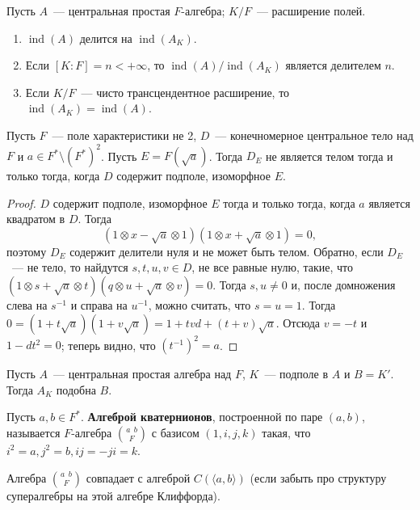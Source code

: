 \documentclass[a4paper,oneside,12pt]{article}
\theoremstyle{plain} { \swapnumbers
\newtheorem{theorem}{Теорема}[subsection]
\newtheorem{corollary}[theorem]{Следствие}
\newtheorem{lemma}[theorem]{Лемма}
\newtheorem{proposition}[theorem]{Утверждение}
\newtheorem{claim}[theorem]{Факт}
}
\theoremstyle{definition} { \swapnumbers
\newtheorem{definition}[theorem]{Определение}
\newtheorem{notation}[theorem]{Обозначение}
\newtheorem{remark}[theorem]{Замечание}
\newtheorem{remarks}[theorem]{Замечания}
\newtheorem{example}[theorem]{Пример}
\newtheorem{examples}[theorem]{Примеры}
\newtheorem{sssection}[theorem]{}
}
\def\la{\langle}
\def\ra{\rangle}
\def\ind{\operatorname{ind}}
\def\quaternion#1#2#3{\binom{{#1}\:\:{#2}}{#3}}
\begin{document}
\begin{proposition}
Пусть $A$~--- центральная простая $F$-алгебра; $K/F$~--- расширение полей.
\begin{enumerate}
\item $\ind(A)$ делится на $\ind(A_K)$.
\item Если $[K:F]=n<+\infty$, то $\ind(A)/\ind(A_K)$ является делителем $n$.
\item Если $K/F$~--- чисто трансцендентное расширение, то $\ind(A_K)=\ind(A)$.
\end{enumerate}
\end{proposition}

\begin{lemma}[Альберт]
Пусть $F$~--- поле характеристики не 2, $D$~--- конечномерное центральное тело над $F$ и $a\in F^*\setminus (F^*)^2$.
Пусть $E=F(\sqrt{a})$. Тогда $D_E$ не является телом тогда и только тогда, когда $D$ содержит подполе, изоморфное $E$.
\end{lemma}
\begin{proof}
$D$ содержит подполе, изоморфное $E$ тогда и только тогда, когда $a$ является квадратом в $D$. Тогда
$$
(1\otimes x-\sqrt{a}\otimes 1)(1\otimes x+\sqrt{a}\otimes 1)=0,
$$
поэтому $D_E$ содержит делители нуля
и не может быть телом. Обратно, если $D_E$~--- не тело, то найдутся $s,t,u,v\in D$, не все равные нулю,
такие, что $(1\otimes s + \sqrt{a}\otimes t)(q\otimes u + \sqrt{a}\otimes v)=0$. Тогда $s,u\neq 0$ и,
после домножения слева на $s^{-1}$ и справа на $u^{-1}$, можно считать, что $s=u=1$. Тогда
$0=(1+t\sqrt{a})(1+v\sqrt{a})=1+tvd+(t+v)\sqrt{a}$. Отсюда $v=-t$ и $1-dt^2=0$; теперь видно, что $(t^{-1})^2=a$.
\end{proof}

\begin{proposition}
Пусть $A$~--- центральная простая алгебра над $F$, $K$~--- подполе в $A$ и
$B=K'$. Тогда $A_K$ подобна $B$.
\end{proposition}

\begin{definition}
Пусть $a,b\in F^*$. {\bf Алгеброй кватернионов}, построенной по паре $(a,b)$, называется $F$-алгебра
$\quaternion{a}{b}{F}$ с базисом $(1,i,j,k)$ такая, что $i^2=a, j^2=b, ij=-ji=k$.
\end{definition}

\begin{remark}
Алгебра $\quaternion{a}{b}{F}$ совпадает с алгеброй $C(\la a,b\ra)$ (если забыть про структуру супералгебры на этой
алгебре Клиффорда).
\end{remark}
\end{document}
